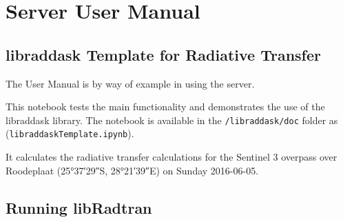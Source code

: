 

\chapter{Server User Manual}
\label{chap:ServerUserManual}

\section{libraddask Template for Radiative Transfer}
\label{sec:libraddaskTemplateforRadiativeTransfer}

The User Manual is by way of example in using the \libraddask{} server.



This notebook tests the main functionality and demonstrates the use of the libraddask library.
The notebook  is available in the \lstinline{/libraddask/doc} folder as 
(\lstinline{libraddaskTemplate.ipynb}).

It calculates the radiative transfer calculations for the Sentinel 3 overpass over
Roodeplaat (\ang{25;37;29}S, \ang{28;21;39}E) on Sunday 2016-06-05.



\section{Running libRadtran}
\label{sec:RunninglibRadtran}

